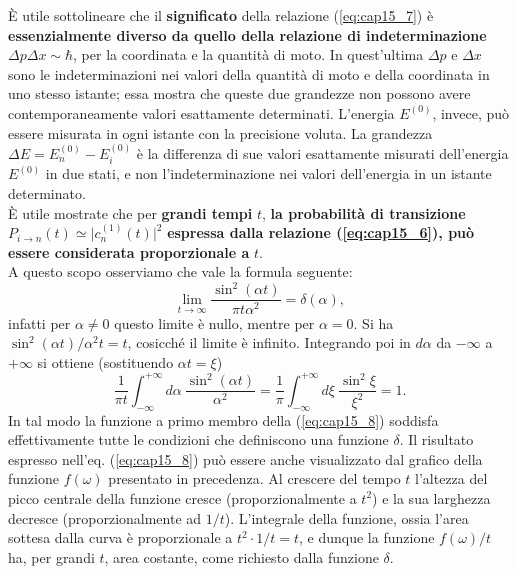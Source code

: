 \documentclass[a4paper,12pt,oneside]{book}
\begin{document}
È utile sottolineare che il \textbf{significato} della relazione (\ref{eq:cap15_7}) è \textbf{essenzialmente diverso da quello della relazione di indeterminazione} $\Delta p \Delta x\sim \hbar$, per la coordinata e la quantità di moto. In quest'ultima $\Delta p$ e $\Delta x$ sono le indeterminazioni nei valori della quantità di moto e della coordinata in uno stesso istante;  essa mostra che queste due grandezze non possono avere contemporaneamente valori esattamente determinati. L'energia $E ^{(0)}$, invece, può essere misurata in ogni istante con la precisione voluta. La grandezza $\Delta E = E_n ^{(0)} - E_i ^{(0)}$ è la differenza di sue valori esattamente misurati dell'energia $E^{(0)}$ in due stati, e non l'indeterminazione nei valori dell'energia in un istante determinato.\\
È utile mostrate che per \textbf{grandi tempi} $t$, \textbf{la probabilità di transizione} $P_{i\rightarrow n} (t) \simeq \vert c_n ^{(1)} (t) \vert ^2$ \textbf{espressa dalla relazione (\ref{eq:cap15_6}), può essere considerata proporzionale a } $t$.\\
A questo scopo osserviamo che vale la formula seguente:
\begin{equation}
\lim _{t \rightarrow \infty} \frac{\sin ^2 (\alpha t)}{\pi t \alpha ^2} = \delta (\alpha),
\label{eq:cap15_8}
\end{equation}
infatti per $\alpha \neq 0$ questo limite è nullo, mentre per  $\alpha = 0$. Si ha $\sin ^2 (\alpha t)/\alpha ^2 t = t$, cosicché il limite è infinito. Integrando poi in $d \alpha$ da $-\infty$ a $+\infty$ si ottiene (sostituendo $\alpha t = \xi$)
\begin{equation}
\frac{1}{\pi t}\int _{-\infty} ^{+\infty} d\alpha \ \frac{\sin ^2 (\alpha t)}{ \alpha ^2} = \frac{1}{\pi}\int _{-\infty} ^{+\infty} d\xi \ \frac{\sin ^2 \xi}{ \xi ^2}=1. 
\end{equation}
In tal modo la funzione a primo membro della (\ref{eq:cap15_8}) soddisfa effettivamente tutte le condizioni che definiscono una funzione $\delta$. Il risultato espresso nell'eq. (\ref{eq:cap15_8}) può essere anche visualizzato dal grafico della funzione $f(\omega)$ presentato in precedenza. Al crescere del tempo $t$ l'altezza del picco centrale della funzione cresce (proporzionalmente a $t^2$) e la sua larghezza decresce (proporzionalmente ad $1/t$). L'integrale della funzione, ossia l'area sottesa dalla curva è proporzionale a $t^2\cdot 1/t =t$, e dunque la funzione $f(\omega)/t$ ha, per grandi $t$, area costante, come richiesto dalla funzione $\delta$.\\
\end{document}
